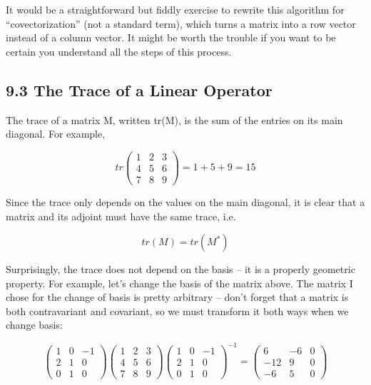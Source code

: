 \documentclass[oneside,english]{amsbook}
\numberwithin{section}{chapter}
\theoremstyle{plain}
\theoremstyle{definition}
\begin{document}
It would be a straightforward but fiddly exercise to rewrite this
algorithm for ``covectorization'' (not a standard term), which turns a
matrix into a row vector instead of a column vector. It might be worth
the trouble if you want to be certain you understand all the steps of
this process.

\subsection{9.3 The Trace of a Linear
	Operator}\label{the-trace-of-a-linear-operator}

The trace of a matrix M, written tr(M), is the sum of the entries on its
main diagonal. For example,

\[tr\begin{pmatrix}
	1 & 2 & 3 \\
	4 & 5 & 6 \\
	7 & 8 & 9
\end{pmatrix} = 1 + 5 + 9 = 15\]

Since the trace only depends on the values on the main diagonal, it is
clear that a matrix and its adjoint must have the same trace, i.e.

\[tr(M) = tr(M^{*})\]

Surprisingly, the trace does not depend on the basis -- it is a properly
geometric property. For example, let's change the basis of the matrix
above. The matrix I chose for the change of basis is pretty arbitrary --
don't forget that a matrix is both contravariant and covariant, so we
must transform it both ways when we change basis:

\[\begin{pmatrix}
	1 & 0 & - 1 \\
	2 & 1 & 0 \\
	0 & 1 & 0
\end{pmatrix}\begin{pmatrix}
	1 & 2 & 3 \\
	4 & 5 & 6 \\
	7 & 8 & 9
\end{pmatrix}\begin{pmatrix}
	1 & 0 & - 1 \\
	2 & 1 & 0 \\
	0 & 1 & 0
\end{pmatrix}^{- 1} = \begin{pmatrix}
	6 & - 6 & 0 \\
	- 12 & 9 & 0 \\
	- 6 & 5 & 0
\end{pmatrix}\]
\end{document}

